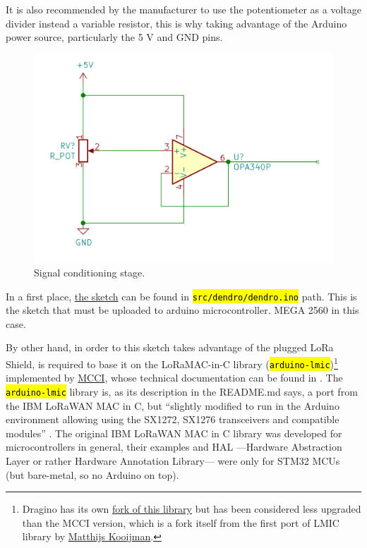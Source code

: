 \documentclass[11pt,a4paper,dvipsnames,twoside]{article}
\newcounter{subsubsubsection}[subsubsection]
\newcommand{\cmd}[1] {\hl{\texttt{#1}}}
\begin{document}
It is also recommended by the manufacturer to use the potentiometer as a voltage divider instead a variable resistor, this is why taking advantage of the Arduino power source, particularly the 5 \si{\volt} and GND pins.

\begin{figure}[htp]
  \centering
    \includegraphics[width=.9\textwidth]{../schemes/Signal_Conditioning.png}
  \caption{Signal conditioning stage.}
  \label{fig:SignalCond}
\end{figure}

In a first place, \href{https://github.com/WyRe/lora-arduino-dendrometer/blob/master/src/arduino/dendro/dendro.ino}{the sketch} can be found in \cmd{src/dendro/dendro.ino} path. This is the sketch that must be uploaded to arduino microcontroller. MEGA 2560 in this case.

By other hand, in order to this sketch takes advantage of the plugged LoRa Shield, is required to base it on the LoRaMAC-in-C library \cite{MCCI_lmic} (\cmd{arduino-lmic})\footnote{Dragino has its own \href{https://github.com/dragino/arduino-lmic}{fork of this library} but has been considered less upgraded than the MCCI version, which is a fork itself from the first port of LMIC library by \href{https://github.com/matthijskooijman}{Matthijs Kooijman}.} implemented by \href{https://mcci.com/}{MCCI}, whose technical documentation can be found in \cite{MCCI_lmic_docs}. The \cmd{arduino-lmic} library is, as its description in the README.md says, a port from the IBM LoRaWAN MAC in C, but \enquote{slightly modified to run in the Arduino environment allowing using the SX1272, SX1276 transceivers and compatible modules} \cite{MCCI_lmic}. The original IBM LoRaWAN MAC in C library was developed for microcontrollers in general, their examples and HAL ---Hardware Abstraction Layer or rather Hardware Annotation Library--- were only for STM32 MCUs (but bare-metal, so no Arduino on top). 
\end{document}
